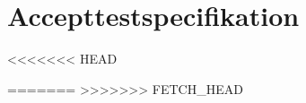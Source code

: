 \chapter{Accepttestspecifikation}

















<<<<<<< HEAD

=======
>>>>>>> FETCH_HEAD








